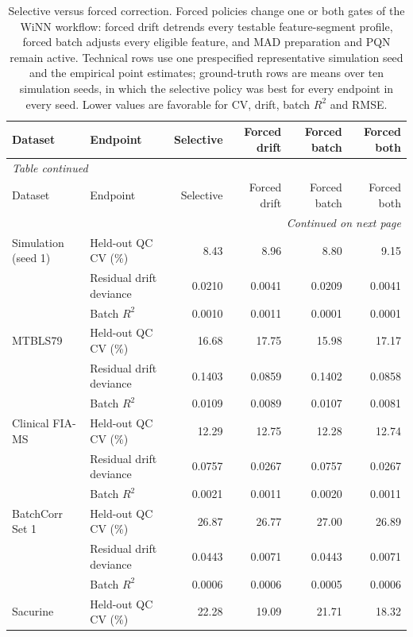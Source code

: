 \footnotesize
\begin{longtable}{llrrrr}
\caption{Selective versus forced correction. Forced policies change one or both gates of the WiNN workflow: forced drift detrends every testable feature-segment profile, forced batch adjusts every eligible feature, and MAD preparation and PQN remain active. Technical rows use one prespecified representative simulation seed and the empirical point estimates; ground-truth rows are means over ten simulation seeds, in which the selective policy was best for every endpoint in every seed. Lower values are favorable for CV, drift, batch $R^2$ and RMSE.}\label{tab:supp_selective_forced}\\
\toprule
Dataset & Endpoint & Selective & Forced drift & Forced batch & Forced both \\
\midrule
\endfirsthead
\multicolumn{6}{l}{\textit{Table \thetable{} continued}}\\
\toprule
Dataset & Endpoint & Selective & Forced drift & Forced batch & Forced both \\
\midrule
\endhead
\midrule
\multicolumn{6}{r}{\textit{Continued on next page}}\\
\endfoot
\bottomrule
\endlastfoot
Simulation (seed 1) & Held-out QC CV (\%) & 8.43 & 8.96 & 8.80 & 9.15 \\
 & Residual drift deviance & 0.0210 & 0.0041 & 0.0209 & 0.0041 \\
 & Batch $R^2$ & 0.0010 & 0.0011 & 0.0001 & 0.0001 \\
\midrule
MTBLS79 & Held-out QC CV (\%) & 16.68 & 17.75 & 15.98 & 17.17 \\
 & Residual drift deviance & 0.1403 & 0.0859 & 0.1402 & 0.0858 \\
 & Batch $R^2$ & 0.0109 & 0.0089 & 0.0107 & 0.0081 \\
\midrule
Clinical FIA-MS & Held-out QC CV (\%) & 12.29 & 12.75 & 12.28 & 12.74 \\
 & Residual drift deviance & 0.0757 & 0.0267 & 0.0757 & 0.0267 \\
 & Batch $R^2$ & 0.0021 & 0.0011 & 0.0020 & 0.0011 \\
\midrule
BatchCorr Set 1 & Held-out QC CV (\%) & 26.87 & 26.77 & 27.00 & 26.89 \\
 & Residual drift deviance & 0.0443 & 0.0071 & 0.0443 & 0.0071 \\
 & Batch $R^2$ & 0.0006 & 0.0006 & 0.0005 & 0.0006 \\
\midrule
Sacurine & Held-out QC CV (\%) & 22.28 & 19.09 & 21.71 & 18.32 \\

\end{longtable}
